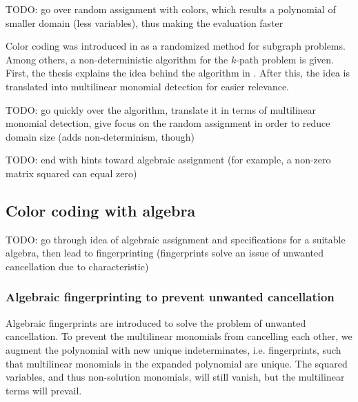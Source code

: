 
TODO: go over random assignment with colors, 
which results a polynomial of smaller domain (less variables), thus 
making the evaluation faster

Color coding was introduced in \cite{Alon95} as a randomized method for subgraph problems. Among others, 
a non-deterministic algorithm for the $k$-path problem is given.
First, the thesis explains the idea behind the algorithm in \cite{Alon95}. 
After this, the idea is translated into multilinear monomial detection for easier relevance.

\begin{problem}
\end{problem}

TODO: go quickly over the algorithm, translate it in terms of multilinear monomial detection, 
give focus on the random assignment in order to reduce domain size (adds non-determinism, though)

TODO: end with hints toward algebraic assignment (for example, a non-zero matrix squared can equal zero)

\subsection{Color coding with algebra}

TODO: go through idea of algebraic assignment and specifications for a suitable algebra, 
then lead to fingerprinting (fingerprints solve an issue of unwanted cancellation due to characteristic)

\subsubsection{Algebraic fingerprinting to prevent unwanted cancellation}

Algebraic fingerprints are introduced to solve the problem of unwanted cancellation. 
To prevent the multilinear monomials from cancelling each other, 
we augment the polynomial with new unique indeterminates, i.e. fingerprints, 
such that multilinear monomials in the expanded polynomial are unique. 
The squared variables, and thus non-solution monomials, will still vanish, but 
the multilinear terms will prevail.


